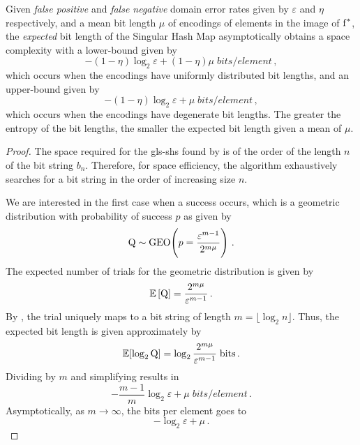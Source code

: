 \documentclass[ ../main.tex]{subfiles}
\begin{document}
\begin{theorem}
Given \emph{false positive} and \emph{false negative} domain error rates given by $\varepsilon$ and $\eta$ respectively, and a mean bit length $\mu$ of encodings of elements in the image of $\Afun$, the \emph{expected} bit length of the Singular Hash Map asymptotically obtains a space complexity with a lower-bound given by
\begin{equation}
    -(1 - \eta) \log_2 \varepsilon + (1 - \eta) \mu \; \si{bits \per element}\,,
\end{equation}
which occurs when the encodings have uniformly distributed bit lengths, and an upper-bound given by
\begin{equation}
    -(1 - \eta) \log_2 \varepsilon + \mu \; \si{bits \per element}\,,
\end{equation}
which occurs when the encodings have degenerate bit lengths. The greater the entropy of the bit lengths, the smaller the expected bit length given a mean of $\mu$. 
\end{theorem}
\begin{proof}
The space required for the \gls{gls-shs} found by  is of the order of the length $n$ of the bit string $b_n$. Therefore, for space efficiency, the algorithm exhaustively searches for a bit string in the order of increasing size $n$.

We are interested in the first case when a success occurs, which is a geometric distribution with probability of success $p$ as given by
\begin{equation}
    \rv{Q} \sim \geodist\!\left(p = \frac{\varepsilon^{m-1}}{2^{m \mu}}\right)\,.
\end{equation}
The expected number of trials for the geometric distribution is given by
\begin{equation}
\label{eq:exp_trials}
    \expectation\left[\rv{Q}\right] = \frac{2^{m \mu}}{\varepsilon^{m-1}}\,.
\end{equation}
By , the \nth trial uniquely maps to a bit string of length $m = \lfloor \log_2 n \rfloor$. Thus, the expected bit length is given approximately by
\begin{equation}
    \expectation[\log_2 \rv{Q}] = \log_2 \frac{2^{m \mu}}{\varepsilon^{m-1}}\; \si{bits}\,.
\end{equation}
Dividing by $m$ and simplifying results in
\begin{equation}
    -\frac{m-1}{m} \log_2 \varepsilon + \mu\; \si{bits \per element}\,.
\end{equation}
Asymptotically, as $m \to \infty$, the bits per element goes to
\begin{equation}
    -\log_2 \varepsilon + \mu\,.
\end{equation}
\end{proof}
\end{document}
